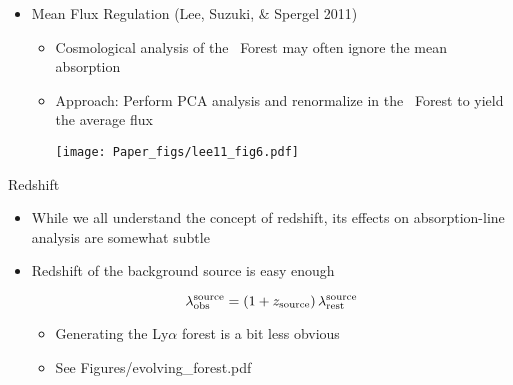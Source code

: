 \documentclass[12pt,letterpaper]{article}
\begin{document}
\begin{Aenumerate}
\begin{itemize}
\begin{itemize}
	\item Mean Flux Regulation (Lee, Suzuki, \& Spergel 2011) 
	  \begin{itemize}
	  \item Cosmological analysis of the \lya\ Forest may often ignore the
	  mean absorption
	  \item Approach:  Perform PCA analysis and renormalize in the \lya\ Forest
	  to yield the average flux

	\texttt{[image: Paper\_figs/lee11\_fig6.pdf]}

	  \end{itemize}

 	\end{itemize}
 \end{itemize}

{\bf \item Redshift}
	\begin{itemize}
	\item While we all understand the concept of redshift, its effects on 
	absorption-line analysis are somewhat subtle
	\item Redshift of the background source is easy enough

	\begin{equation}
	\lambda_{\rm obs}^{\rm source} = (1+z_{\rm source}) \, \lambda_{\rm rest}^{\rm source}
	\end{equation}
		\begin{itemize}
		\item Generating the Ly$\alpha$ forest is a bit less obvious
		\item See Figures/evolving\_forest.pdf 
		\end{itemize}
 	\end{itemize}


\end{Aenumerate}
\end{document}
